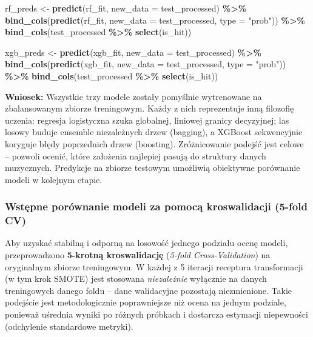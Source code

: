 \documentclass[
]{article}
\newenvironment{Shaded}{\begin{snugshade}}{\end{snugshade}}
\newcommand{\AttributeTok}[1]{\textcolor[rgb]{0.13,0.29,0.53}{#1}}
\newcommand{\FunctionTok}[1]{\textcolor[rgb]{0.13,0.29,0.53}{\textbf{#1}}}
\newcommand{\NormalTok}[1]{#1}
\newcommand{\OtherTok}[1]{\textcolor[rgb]{0.56,0.35,0.01}{#1}}
\newcommand{\SpecialCharTok}[1]{\textcolor[rgb]{0.81,0.36,0.00}{\textbf{#1}}}
\newcommand{\StringTok}[1]{\textcolor[rgb]{0.31,0.60,0.02}{#1}}
\begin{document}
\begin{Shaded}
\begin{Highlighting}[]
\NormalTok{rf\_preds }\OtherTok{\textless{}{-}} \FunctionTok{predict}\NormalTok{(rf\_fit, }\AttributeTok{new\_data =}\NormalTok{ test\_processed) }\SpecialCharTok{\%\textgreater{}\%}
  \FunctionTok{bind\_cols}\NormalTok{(}\FunctionTok{predict}\NormalTok{(rf\_fit, }\AttributeTok{new\_data =}\NormalTok{ test\_processed, }\AttributeTok{type =} \StringTok{"prob"}\NormalTok{)) }\SpecialCharTok{\%\textgreater{}\%}
  \FunctionTok{bind\_cols}\NormalTok{(test\_processed }\SpecialCharTok{\%\textgreater{}\%} \FunctionTok{select}\NormalTok{(is\_hit))}

\NormalTok{xgb\_preds }\OtherTok{\textless{}{-}} \FunctionTok{predict}\NormalTok{(xgb\_fit, }\AttributeTok{new\_data =}\NormalTok{ test\_processed) }\SpecialCharTok{\%\textgreater{}\%}
  \FunctionTok{bind\_cols}\NormalTok{(}\FunctionTok{predict}\NormalTok{(xgb\_fit, }\AttributeTok{new\_data =}\NormalTok{ test\_processed, }\AttributeTok{type =} \StringTok{"prob"}\NormalTok{)) }\SpecialCharTok{\%\textgreater{}\%}
  \FunctionTok{bind\_cols}\NormalTok{(test\_processed }\SpecialCharTok{\%\textgreater{}\%} \FunctionTok{select}\NormalTok{(is\_hit))}
\end{Highlighting}
\end{Shaded}

\textbf{Wniosek:} Wszystkie trzy modele zostały pomyślnie wytrenowane na
zbalansowanym zbiorze treningowym. Każdy z nich reprezentuje inną
filozofię uczenia: regresja logistyczna szuka globalnej, liniowej
granicy decyzyjnej; las losowy buduje ensemble niezależnych drzew
(bagging), a XGBoost sekwencyjnie koryguje błędy poprzednich drzew
(boosting). Zróżnicowanie podejść jest celowe -- pozwoli ocenić, które
założenia najlepiej pasują do struktury danych muzycznych. Predykcje na
zbiorze testowym umożliwią obiektywne porównanie modeli w kolejnym
etapie.

\subsubsection{Wstępne porównanie modeli za pomocą kroswalidacji (5-fold
CV)}\label{wstux119pne-poruxf3wnanie-modeli-za-pomocux105-kroswalidacji-5-fold-cv}

Aby uzyskać stabilną i odporną na losowość jednego podziału ocenę
modeli, przeprowadzono \textbf{5-krotną kroswalidację} (\emph{5-fold
Cross-Validation}) na oryginalnym zbiorze treningowym. W każdej z 5
iteracji receptura transformacji (w tym krok SMOTE) jest stosowana
\emph{niezależnie} wyłącznie na danych treningowych danego foldu -- dane
walidacyjne pozostają niezmienione. Takie podejście jest metodologicznie
poprawniejsze niż ocena na jednym podziale, ponieważ uśrednia wyniki po
różnych próbkach i dostarcza estymacji niepewności (odchylenie
standardowe metryki).
\end{document}
